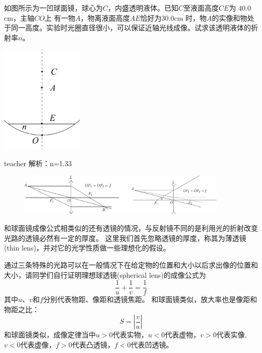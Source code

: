 \begin{example}
如图所示为一凹球面镜，球心为$ C$，内盛透明液体。已知$ C $至液面高度$ CE $为 $40.0$cm，主轴$ CO $上 有一物$A$，物离液面高度$AE$恰好为$ 30.0$cm 时，物$A $的实像和物处于同一高度。实验时光圈直径很小，可以保证近轴光线成像。试求该透明液体的折射率$ n$。
	\begin{flushright}
		\includegraphics[width = 0.3\textwidth]{images/opt-10.pdf} 
	\end{flushright}
	\begin{taggedblock}{teacher}
		\noindent
		解析：n=1.33
	\end{taggedblock}
\end{example}




\begin{figure}
\begin{center}
\includegraphics[width = 0.9\textwidth]{images/lense-tu-path.pdf}
\end{center}
\end{figure}
和球面镜成像公式相类似的还有透镜的情况，与反射镜不同的是利用光的折射改变光路的透镜必然有一定的厚度。
这里我们首先忽略透镜的厚度，称其为{\heiti 薄透镜}(thin lens)，并对它的光学性质做一些理想化的假设。


通过三条特殊的光路可以在一般情况下在给定物的位置和大小以后求出像的位置和大小，请同学们自行证明理想{\heiti 球透镜}(spherical lens)的成像公式为
\begin{equation}
\frac{1}{u}+\frac{1}{v}=\frac{1}{f}
\end{equation}
其中$u$、$v$和$f$分别代表物距、像距和透镜焦距。
和球面镜类似，放大率也是像距和物距之比：
\begin{equation}
S = \left |\frac{v}{u}\right |
\end{equation}
和球面镜类似，成像定律当中$u>0$代表实物，$u<0$代表虚物，$v>0$代表实像,$v<0$代表虚像，$f>0$代表凸透镜，$f<0$代表凹透镜。

